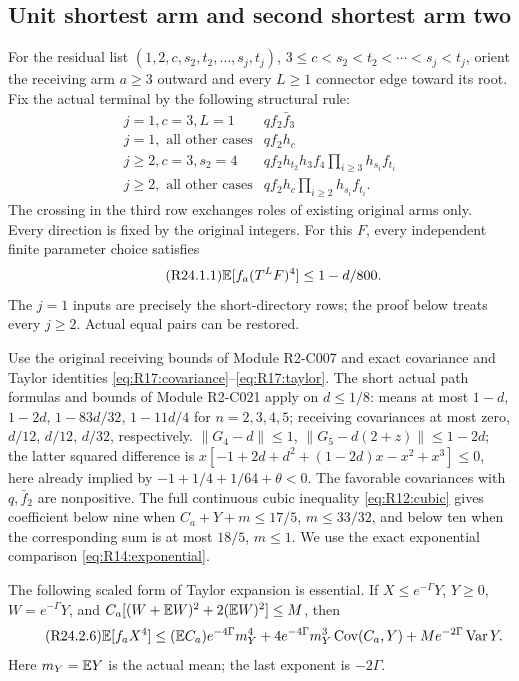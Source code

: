 \subsection{Unit shortest arm and second shortest arm two}\label{proof:R2-C024}
For the residual list $(1,2,c,s_2,t_2,\ldots,s_j,t_j)$,
$3\le c<s_2<t_2<\cdots<s_j<t_j$, orient the receiving arm $a\ge3$
outward and every $L\ge1$ connector edge toward its root. Fix the
actual terminal by the following structural rule:
\begin{equation}\tag{R24.1.table}\label{eq:R24:directions}
\begin{array}{c|l}
j=1,c=3,L=1&qf_2\bar f_3\\
j=1,\text{ all other cases}&qf_2h_c\\
j\ge2,c=3,s_2=4&qf_2h_{t_2}h_3f_4\prod_{i\ge3}h_{s_i}f_{t_i}\\
j\ge2,\text{ all other cases}&qf_2h_c\prod_{i\ge2}h_{s_i}f_{t_i}.
\end{array}
\end{equation}
The crossing in the third row exchanges roles of existing original
arms only. Every direction is fixed by the original integers.
For this $F$, every independent finite parameter choice satisfies
\begin{equation}\tag{R24.1.1}\label{eq:R24:claim}
\mathbb E[f_a(T^LF)^4]\le1-d/800.
\end{equation}
The $j=1$ inputs are precisely the short-directory rows;
the proof below treats every $j\ge2$. Actual equal pairs can be restored.

Use the original receiving bounds of Module R2-C007 and exact
covariance and Taylor identities
\eqref{eq:R17:covariance}--\eqref{eq:R17:taylor}.
The short actual path formulas and bounds of Module R2-C021 apply
on $d\le1/8$: means at most $1-d$, $1-2d$, $1-83d/32$,
$1-11d/4$ for $n=2,3,4,5$; receiving covariances at most zero,
$d/12$, $d/12$, $d/32$, respectively.
$\|G_4-d\|\le1$, $\|G_5-d(2+z)\|\le1-2d$; the latter squared
difference is $x[-1+2d+d^2+(1-2d)x-x^2+x^3]\le0$, here already
implied by $-1+1/4+1/64+\theta<0$.
The favorable covariances with $q,\bar f_2$ are nonpositive.
The full continuous cubic inequality \eqref{eq:R12:cubic} gives
coefficient below nine when $C_a+Y+m\le17/5$, $m\le33/32$,
and below ten when the corresponding sum is at most $18/5$, $m\le1$.
We use the exact exponential comparison \eqref{eq:R14:exponential}.

The following scaled form of Taylor expansion is essential.
If $X\le e^{-\Gamma}Y$, $Y\ge0$, $W=e^{-\Gamma}Y$, and
$C_a[(W+\mathbb E W)^2+2(\mathbb E W)^2]\le M$, then
\begin{equation}\tag{R24.2.6}\label{eq:R24:scaled}
\mathbb E[f_aX^4]\le(\mathbb E C_a)e^{-4\Gamma}m_Y^4
+4e^{-4\Gamma}m_Y^3\operatorname{Cov}(C_a,Y)
+Me^{-2\Gamma}\operatorname{Var}Y.
\end{equation}
Here $m_Y=\mathbb E Y$ is the actual mean; the last exponent is $-2\Gamma$.

